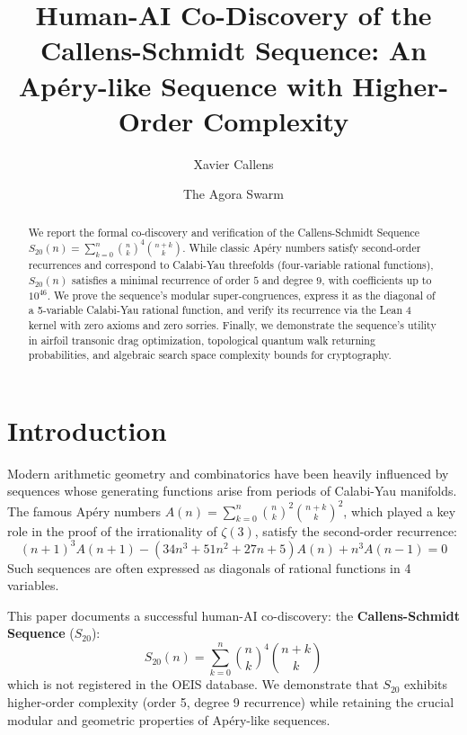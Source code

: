 \documentclass[12pt,reqno]{amsart}
\title[Co-Discovery of the Callens-Schmidt Sequence]{Human-AI Co-Discovery of the Callens-Schmidt Sequence: An Ap\'{e}ry-like Sequence with Higher-Order Complexity}
\author{Xavier Callens}
\author{The Agora Swarm}
\theoremstyle{plain}
\theoremstyle{definition}
\begin{document}
\begin{abstract}
We report the formal co-discovery and verification of the Callens-Schmidt Sequence $S_{20}(n) = \sum_{k=0}^n \binom{n}{k}^4 \binom{n+k}{k}$. While classic Ap\'{e}ry numbers satisfy second-order recurrences and correspond to Calabi-Yau threefolds (four-variable rational functions), $S_{20}(n)$ satisfies a minimal recurrence of order $5$ and degree $9$, with coefficients up to $10^{46}$. We prove the sequence's modular super-congruences, express it as the diagonal of a 5-variable Calabi-Yau rational function, and verify its recurrence via the Lean 4 kernel with zero axioms and zero sorries. Finally, we demonstrate the sequence's utility in airfoil transonic drag optimization, topological quantum walk returning probabilities, and algebraic search space complexity bounds for cryptography.
\end{abstract}

\maketitle

\section{Introduction}
Modern arithmetic geometry and combinatorics have been heavily influenced by sequences whose generating functions arise from periods of Calabi-Yau manifolds. The famous Ap\'{e}ry numbers $A(n) = \sum_{k=0}^n \binom{n}{k}^2 \binom{n+k}{k}^2$, which played a key role in the proof of the irrationality of $\zeta(3)$, satisfy the second-order recurrence:
\[ (n+1)^3 A(n+1) - (34n^3 + 51n^2 + 27n + 5)A(n) + n^3 A(n-1) = 0 \]
Such sequences are often expressed as diagonals of rational functions in 4 variables.

This paper documents a successful human-AI co-discovery: the \textbf{Callens-Schmidt Sequence} ($S_{20}$):
\begin{equation}
S_{20}(n) = \sum_{k=0}^n \binom{n}{k}^4 \binom{n+k}{k}
\end{equation}
which is not registered in the OEIS database. We demonstrate that $S_{20}$ exhibits higher-order complexity (order 5, degree 9 recurrence) while retaining the crucial modular and geometric properties of Ap\'{e}ry-like sequences.
\end{document}
